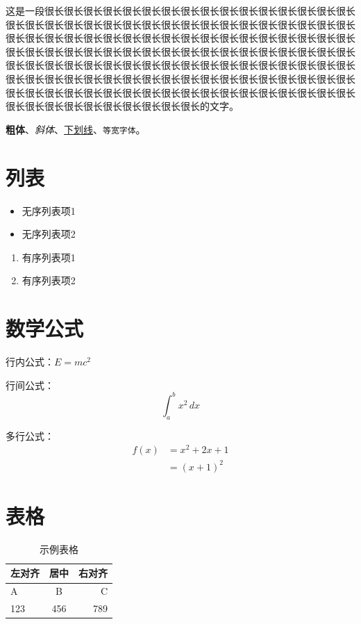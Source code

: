 这是一段很长很长很长很长很长很长很长很长很长很长很长很长很长很长很长很长很长很长很长很长很长很长很长很长很长很长很长很长很长很长很长很长很长很长很长很长很长很长很长很长很长很长很长很长很长很长很长很长很长很长很长很长很长很长很长很长很长很长很长很长很长很长很长很长很长很长很长很长很长很长很长很长很长很长很长很长很长很长很长很长很长很长很长很长很长很长很长很长很长很长很长很长很长很长很长很长很长很长很长很长很长很长很长很长很长很长很长很长很长很长很长很长很长很长很长很长很长很长很长很长很长很长很长很长很长很长很长很长很长很长很长很长很长很长的文字。

\textbf{粗体}、\textit{斜体}、\underline{下划线}、\texttt{等宽字体}。

\section{列表}
\begin{itemize}
    \item 无序列表项1
    \item 无序列表项2
\end{itemize}

\begin{enumerate}
    \item 有序列表项1
    \item 有序列表项2
\end{enumerate}

\section{数学公式}
行内公式：$E=mc^2$

行间公式：
\[ \int_{a}^{b} x^2 \,dx \]

多行公式：
\begin{align}
    f(x) &= x^2 + 2x + 1 \\
         &= (x + 1)^2
\end{align}

\section{表格}

\begin{table}[h]
\begin{tabular}{lcr}
\toprule
左对齐 & 居中 & 右对齐 \\
\midrule
A & B & C \\
123 & 456 & 789 \\
\bottomrule
\end{tabular}
\centering
\caption{示例表格}
\label{tab:example}
\end{table}

